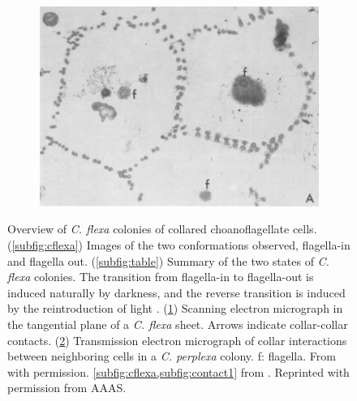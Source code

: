\begin{figure}[htbp]
\begin{subfigure}[b]{0.57\textwidth}
		\caption{}
		\label{subfig:contact1}
	\end{subfigure}
	\begin{subfigure}[b]{0.42\textwidth}
		\centering
		\includegraphics[width=\textwidth]{contact2.png}
		\caption{}
		\label{subfig:contact2}
	\end{subfigure}
	\caption[Overview of \textit{C. flexa} colonies of collared choanoflagellate cells]{Overview of \textit{C. flexa} colonies of collared choanoflagellate cells. (\ref{subfig:cflexa}) Images of the two conformations observed, flagella-in and flagella out. (\ref{subfig:table}) Summary of the two states of \textit{C. flexa} colonies. The transition from flagella-in to flagella-out is induced naturally by darkness, and the reverse transition is induced by the reintroduction of light \citep{brunet2019}. (\ref{subfig:contact1}) Scanning electron micrograph in the tangential plane of a \textit{C. flexa} sheet. Arrows indicate collar-collar contacts. (\ref{subfig:contact2}) Transmission electron micrograph of collar interactions between neighboring cells in a \textit{C. perplexa} colony. f: flagella. From \citet{leadbeater1983} with permission. \cref{subfig:cflexa,subfig:contact1} from \citet{brunet2019}. Reprinted with permission from AAAS.}
	\label{fig:cflexa}
\end{figure} 

